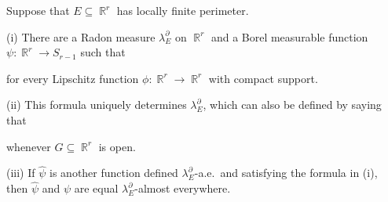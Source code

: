  Suppose that $E\subseteq\BbbR^r$ has locally
finite perimeter.

(i) There are a Radon measure $\lambda^{\partial}_E$ on $\BbbR^r$ and a
Borel measurable function $\psi:\BbbR^r\to S_{r-1}$ such that


\noindent for every Lipschitz function $\phi:\BbbR^r\to\BbbR^r$ with
compact support.

(ii) This formula uniquely determines $\lambda^{\partial}_E$, which can
also be defined by saying that


\noindent whenever $G\subseteq\BbbR^r$ is open.

(iii) If $\hat\psi$ is another function defined
$\lambda^{\partial}_E$-a.e.\ and satisfying the formula in (i),
then $\hat\psi$ and $\psi$ are equal
$\lambda^{\partial}_E$-almost everywhere.

